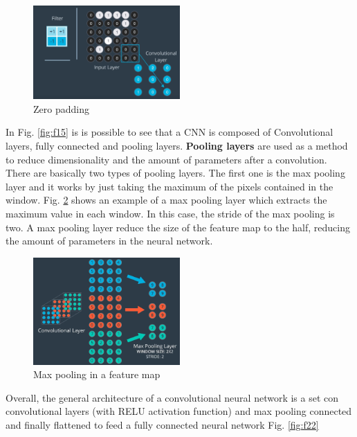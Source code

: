 \documentclass{article}
\begin{document}
\begin{figure}[ht]
    \centering
    \includegraphics[width=0.5\textwidth,height=0.5\textheight,keepaspectratio]{images/padding.png}
    \captionsetup{justification=centering}
    \caption{Zero padding}
    \label{fig:f20}
\end{figure}

In Fig. \ref{fig:f15} is is possible to see that a CNN is composed of Convolutional layers, fully connected and pooling layers. \textbf{Pooling layers} are used as a method to reduce dimensionality and the amount of parameters after a convolution. There are basically two types of pooling layers. The first one is the max pooling layer and it works by just taking the maximum of the pixels contained in the window. Fig. \ref{fig:f21} shows an example of a max pooling layer which extracts the maximum value in each window. In this case, the stride of the max pooling is two. A max pooling layer reduce the size of the feature map to the half, reducing the amount of parameters in the neural network.

\begin{figure}[ht]
    \centering
    \includegraphics[width=0.5\textwidth,height=0.5\textheight,keepaspectratio]{images/max_pooling.png}
    \captionsetup{justification=centering}
    \caption{Max pooling in a feature map}
    \label{fig:f21}
\end{figure}

Overall, the general architecture of a convolutional neural network is a set con convolutional layers (with RELU activation function) and max pooling connected and finally flattened to feed a fully connected neural network Fig. \ref{fig:f22}
\end{document}

